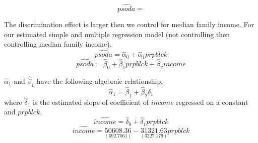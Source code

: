 \documentclass[12pt]{report}
\begin{document}
\vspace{-\baselineskip}
$$\widehat{psoda}=$$

\noindent The discrimination effect is larger then we control for median family income. For our estimated simple and multiple regression model (not controlling then controlling median family income),
$$\widehat{psoda} = \hat{\alpha}_0 + \hat{\alpha}_1prpblck$$
$$\widehat{psoda} = \hat{\beta}_0 + \hat{\beta}_1prpblck + \hat{\beta}_2income$$

\noindent $\hat{\alpha}_1$ and $\hat{\beta}_1$ have the following algebraic relationship,
$$\hat{\alpha}_1 = \hat{\beta}_1 + \hat{\beta}_2\hat{\delta}_1$$
\noindent where $\hat{\delta}_1$ is the estimated slope of coefficient of $income$ regressed on a constant and $prpblck$,
$$\widehat{income} = \hat{\delta}_0 + \hat{\delta}_1 prpblck$$
$$\widehat{income} = \underset{(692.7061)}{50608.36} - \underset{(3227.179)}{31321.63} prpblck$$
\end{document}
